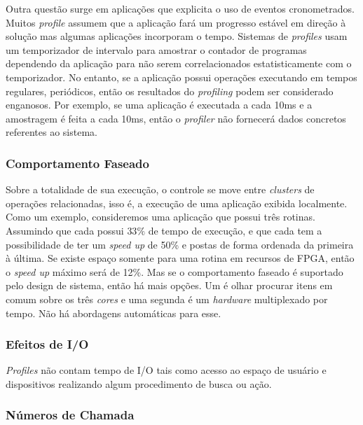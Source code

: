 Outra questão surge em aplicações que explicita o uso de eventos cronometrados. Muitos \textit{profile} assumem que a aplicação fará um progresso estável em direção à solução mas algumas aplicações incorporam o tempo. Sistemas de \textit{profiles} usam um temporizador de intervalo para amostrar o contador de programas dependendo da aplicação para não serem correlacionados estatisticamente com o temporizador. No entanto, se a aplicação possui operações executando em tempos regulares, periódicos, então os resultados do \textit{profiling} podem ser considerado enganosos. Por exemplo, se uma aplicação é executada a cada 10ms e a amostragem é feita a cada 10ms, então o \textit{profiler} não fornecerá dados concretos referentes ao sistema.



\subsubsection{Comportamento Faseado}

Sobre a totalidade de sua execução, o controle se move entre \textit{clusters} de operações relacionadas, isso é, a execução de uma aplicação exibida localmente. Como um exemplo, consideremos uma aplicação que possui três rotinas. Assumindo que cada possui $ 33\% $ de tempo de execução, e que cada tem a possibilidade de ter um \textit{speed up} de 50\% e postas de forma ordenada da primeira à última. Se existe espaço somente para uma rotina em recursos de FPGA, então o \textit{speed up} máximo será de 12\%. Mas se o comportamento faseado é suportado pelo design de sistema, então há mais opções. Um é olhar procurar itens em comum sobre os três \textit{cores} e uma segunda é um \textit{hardware} multiplexado por tempo. Não há abordagens automáticas para esse.



\subsubsection{Efeitos de I/O}

\textit{Profiles} não contam tempo de I/O tais como acesso ao espaço de usuário e dispositivos realizando algum procedimento de busca ou ação.



\subsubsection{Números de Chamada}

